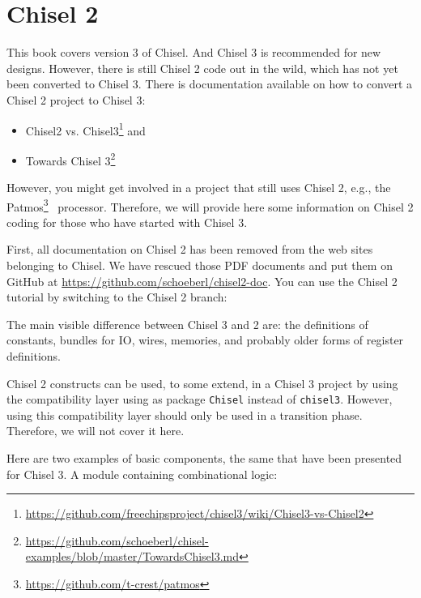 \documentclass[%
    10pt,
    headinclude, footexclude,
    openright, %
    notitlepage,
    cleardoubleempty,
    headsepline,
    pointlessnumbers,
    bibtotoc, idxtotoc,
    ]{scrbook}
\newcommand{\code}[1]{{\small{\texttt{#1}}}}
\newcommand{\myref}[2]{\href{#1}{#2}}
\renewcommand{\myref}[2]{{#2}{\footnote{\url{#1}}}}
\begin{document}
\chapter{Chisel 2}

This book covers version 3 of Chisel. And Chisel 3 is recommended for new designs.
However, there is still Chisel 2 code out in the wild, which has not yet been converted
to Chisel 3. There is documentation available on how to convert a Chisel 2 project to
Chisel 3:

\begin{itemize}
\item \myref{https://github.com/freechipsproject/chisel3/wiki/Chisel3-vs-Chisel2}{Chisel2 vs. Chisel3} and
\item \myref{https://github.com/schoeberl/chisel-examples/blob/master/TowardsChisel3.md}{Towards Chisel 3}
\end{itemize}

However, you might get involved in a project that still uses Chisel 2,
e.g., the \myref{https://github.com/t-crest/patmos}{Patmos}~\cite{patmos:rts2018} processor.
Therefore, we will provide here some information on Chisel 2 coding for those who
have started with Chisel 3.

First, all documentation on Chisel 2 has been removed from the web sites
belonging to Chisel. We have rescued those PDF documents and put them
on GitHub at \url{https://github.com/schoeberl/chisel2-doc}.
You can use the Chisel 2 tutorial by switching to the Chisel 2 branch:


The main visible difference between Chisel 3 and 2 are: the definitions of
constants, bundles for IO, wires, memories, and probably older forms of register
definitions.

Chisel 2 constructs can be used, to some extend, in a Chisel 3 project by
using the compatibility layer using as package \code{Chisel} instead of \code{chisel3}.
However, using this compatibility layer should only be used in a transition phase.
Therefore, we will not cover it here.

Here are two examples of basic components, the same that have been presented
for Chisel 3. A module containing combinational logic:

\end{document}
